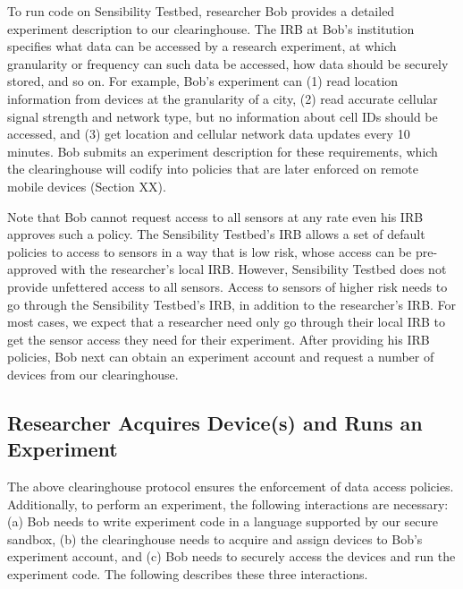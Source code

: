 To run code on Sensibility Testbed, researcher Bob provides a
detailed experiment description to our clearinghouse. The IRB at
Bob's institution specifies what data can be accessed by a
research experiment, at which granularity or frequency can such
data be accessed, how data should be securely stored, and so on.
For example, Bob's experiment can (1) read location information
from devices at the granularity of a city, (2) read accurate
cellular signal strength and network type, but no information
about cell IDs should be accessed, and (3) get location and
cellular network data updates every 10 minutes. Bob submits an
experiment description for these requirements, which the
clearinghouse will codify into policies that are later enforced
on remote mobile devices (Section XX).

Note that Bob cannot request access to all sensors at any rate
even his IRB approves such a policy. The Sensibility Testbed's
IRB allows a set of default policies to access to sensors in a
way that is low risk, whose access can be pre-approved with the
researcher's local IRB. However, Sensibility Testbed does not
provide unfettered access to all sensors. Access to sensors of
higher risk needs to go through the Sensibility Testbed's IRB,
in addition to the researcher's IRB. For most cases, we expect
that a researcher need only go through their local IRB to get
the sensor access they need for their experiment. After
providing his IRB policies, Bob next can obtain an experiment
account and request a number of devices from our clearinghouse.

\subsection{Researcher Acquires Device(s) and Runs an
Experiment}

The above clearinghouse protocol ensures the enforcement of data
access policies. Additionally, to perform an experiment, the
following interactions are necessary: (a) Bob needs to write
experiment code in a language supported by our secure sandbox,
(b) the clearinghouse needs to acquire and assign devices to
Bob's experiment account, and (c) Bob needs to securely access
the devices and run the experiment code. The following describes
these three interactions.

